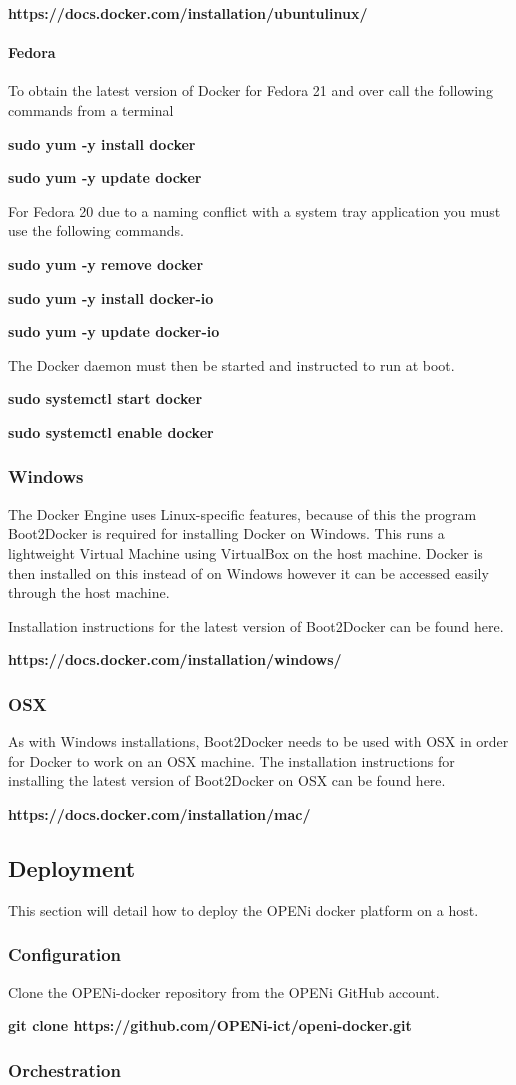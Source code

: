 \documentclass[10pt,a4paper]{article}
\begin{document}
\centerline{\textbf{https://docs.docker.com/installation/ubuntulinux/}}

\paragraph{Fedora}
To obtain the latest version of Docker for Fedora 21 and over call the following commands from a terminal

\centerline{\textbf{sudo yum -y install docker}}
\centerline{\textbf{sudo yum -y update docker}}

For Fedora 20 due to a naming conflict with a system tray application you must use the following commands.

\centerline{\textbf{sudo yum -y remove docker}}
\centerline{\textbf{sudo yum -y install docker-io}}
\centerline{\textbf{sudo yum -y update docker-io}}

The Docker daemon must then be started and instructed to run at boot.

\centerline{\textbf{sudo systemctl start docker}}
\centerline{\textbf{sudo systemctl enable docker}}

\subsubsection{Windows}

The Docker Engine uses Linux-specific features, because of this the program Boot2Docker is required for installing Docker on Windows. This runs a lightweight Virtual Machine using VirtualBox on the host machine. Docker is then installed on this instead of on Windows however it can be accessed easily through the host machine.

Installation instructions for the latest version of Boot2Docker can be found here.
\centerline{\textbf{https://docs.docker.com/installation/windows/}}

\subsubsection{OSX}
As with Windows installations, Boot2Docker needs to be used with OSX in order for Docker to work on an OSX machine.
The installation instructions for installing the latest version of Boot2Docker on OSX can be found here.
\centerline{\textbf{https://docs.docker.com/installation/mac/}}

\newpage
 
\subsection{Deployment}
This section will detail how to deploy the OPENi docker platform on a host.

\subsubsection{Configuration}
Clone the OPENi-docker repository from the OPENi GitHub account.\\
\centerline{\textbf{git clone https://github.com/OPENi-ict/openi-docker.git}}

\subsubsection{Orchestration}
\end{document}
